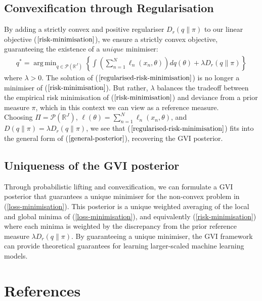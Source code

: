\documentclass[twoside,11pt]{article}
\DeclareMathOperator*{\argmin}{arg\,min}
\begin{document}
\subsection{Convexification through Regularisation}
By adding a strictly convex and positive regulariser $D_r(q\| \pi)$ to our linear objective ($\ref{risk-minimisation}$), we ensure a strictly convex objective, guaranteeing the existence of a $\textit{unique}$ minimiser:
\begin{align}
    q^* = \argmin_{q \in \mathcal{P}(\mathbb{R}^J)} \left\{\int \left( \sum_{n=1}^N\ell_n(x_n, \theta)\right) dq(\theta) + \lambda D_r(q \| \pi)\right\}
\label{regularised-risk-minimisation}
\end{align}
where $\lambda > 0$. The solution of ($\ref{regularised-risk-minimisation}$) is no longer a minimiser of ($\ref{risk-minimisation}$). But rather, $\lambda$ balances the tradeoff between the empirical risk minimisation of ($\ref{risk-minimisation}$) and deviance from a prior measure $\pi$, which in this context we can view as a reference measure.\\
\newline 
Choosing $\Pi =\mathcal{P}(\mathbb{R}^J)$, $\ell(\theta) = \sum_{n=1}^N\ell_n(x_n, \theta)$, and $D(q\| \pi) = \lambda D_r(q\| \pi)$, we see that ($\ref{regularised-risk-minimisation}$) fits into the general form of ($\ref{general-posterior}$), recovering the GVI posterior. 
\subsection{Uniqueness of the GVI posterior}
Through probabilistic lifting and convexification, we can formulate a GVI posterior that guarantees a unique minimiser for the non-convex problem in (\ref{loss-minimisation}). This posterior is a unique weighted averaging of the local and global minima of (\ref{loss-minimisation}), and equivalently (\ref{risk-minimisation}) where each minima is weighted by the discrepancy from the prior reference measure $\lambda D_r(q \| \pi)$. By guaranteeing a unique minimiser, the GVI framework can provide theoretical guarantees for learning larger-scaled machine learning models.

\begingroup
\let\clearpage\relax
\AtNextBibliography{\small}
\section*{References}
\printbibliography[heading=talikarng, title = {References}]
\endgroup
\end{document}
